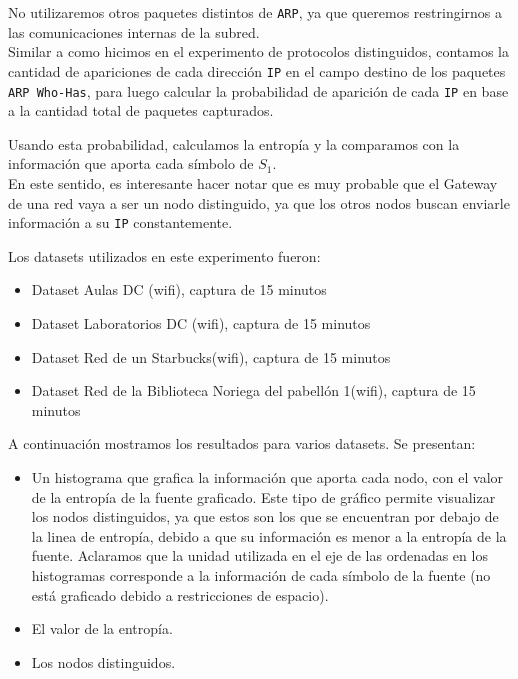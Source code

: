 No utilizaremos otros paquetes distintos de \texttt{ARP}, ya que queremos restringirnos a las comunicaciones internas de la subred. \\

Similar a como hicimos en el experimento de protocolos distinguidos, contamos la cantidad de apariciones de cada dirección \texttt{IP} en el campo destino de los paquetes \texttt{ARP Who-Has}, para luego calcular la probabilidad de aparición de cada \texttt{IP} en base a la cantidad total de paquetes capturados.

Usando esta probabilidad, calculamos la entropía y la comparamos con la información que aporta cada símbolo de $S_1$.\\

En este sentido, es interesante hacer notar que es muy probable que el Gateway de una red vaya a ser un nodo distinguido,
    ya que los otros nodos buscan enviarle información a su  \texttt{IP} constantemente.

\vspace{0.5em}


Los datasets utilizados en este experimento fueron: \\

\begin{itemize}
    \item Dataset Aulas DC (wifi), captura de 15 minutos
    \item Dataset Laboratorios DC (wifi), captura de 15 minutos
    \item Dataset Red de un Starbucks(wifi), captura de 15 minutos
    \item Dataset Red de la Biblioteca Noriega del pabellón 1(wifi), captura de 15 minutos
\end{itemize}

\vspace{0.5em}

A continuación mostramos los resultados para varios datasets. Se presentan:

\begin{itemize}
    \item Un histograma que grafica la información que aporta cada nodo, con el valor de la entropía de la fuente graficado. Este tipo de gráfico permite visualizar los nodos distinguidos, ya que estos son los que se encuentran por debajo de la linea de entropía, debido a que su información es menor a la entropía de la fuente. Aclaramos que la unidad utilizada en el eje de las ordenadas en los histogramas corresponde a la información de cada símbolo de la fuente (no está graficado debido a restricciones de espacio).
    \item El valor de la entropía.
    \item Los nodos distinguidos.
\end{itemize}

